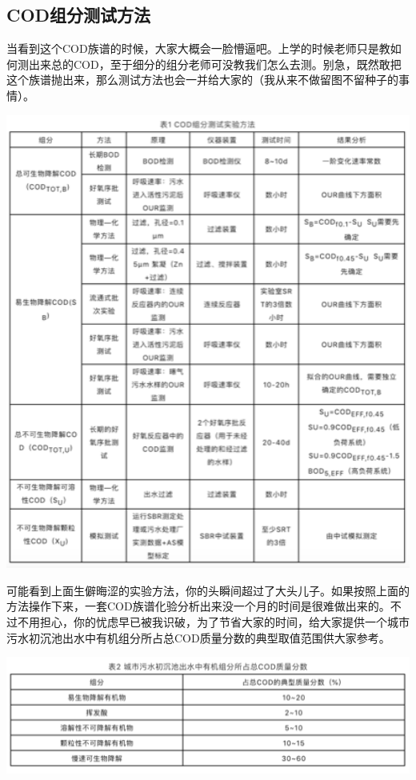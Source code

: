 \documentclass[]{book}
\begin{document}
\hypertarget{codux7ec4ux5206ux6d4bux8bd5ux65b9ux6cd5}{%
\subsection{COD组分测试方法}\label{codux7ec4ux5206ux6d4bux8bd5ux65b9ux6cd5}}

当看到这个COD族谱的时候，大家大概会一脸懵逼吧。上学的时候老师只是教如何测出来总的COD，至于细分的组分老师可没教我们怎么去测。别急，既然敢把这个族谱抛出来，那么测试方法也会一并给大家的（我从来不做留图不留种子的事情）。

\includegraphics[width=5.93in]{images/cod2}

可能看到上面生僻晦涩的实验方法，你的头瞬间超过了大头儿子。如果按照上面的方法操作下来，一套COD族谱化验分析出来没一个月的时间是很难做出来的。不过不用担心，你的忧虑早已被我识破，为了节省大家的时间，给大家提供一个城市污水初沉池出水中有机组分所占总COD质量分数的典型取值范围供大家参考。

\includegraphics[width=6.67in]{images/cod3}
\end{document}
